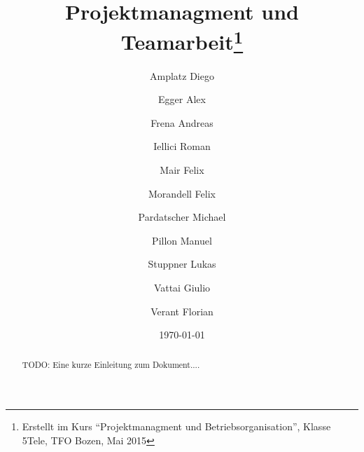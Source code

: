 \documentclass[a4paper]{article}
\title{Projektmanagment und Teamarbeit\thanks{Erstellt 
im Kurs ``Projektmanagment und Betriebsorganisation'', Klasse 5Tele, TFO Bozen, Mai 2015}}
\author{Amplatz Diego
\and	Egger Alex
\and	Frena Andreas
\and	Iellici Roman
\and	Mair Felix
\and	Morandell Felix
\and	Pardatscher Michael
\and	Pillon Manuel
\and	Stuppner Lukas
\and	Vattai Giulio
\and	Verant Florian}
\begin{document}
\date{\today}

\maketitle

\begin{abstract}
 TODO: Eine kurze Einleitung zum Dokument....
\end{abstract}

\newpage


\begin{sloppypar}
\tableofcontents













\end{sloppypar}
\end{document}
